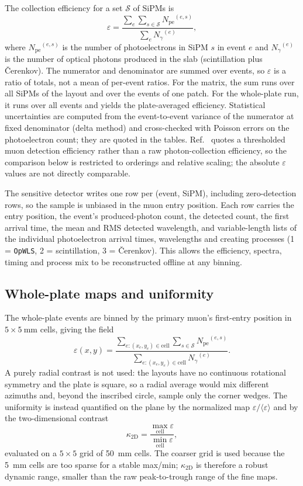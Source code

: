 \documentclass[preprint,12pt]{elsarticle}
\newcommand{\pe}{\ensuremath{N_{\mathrm{pe}}}}
\newcommand{\ngam}{\ensuremath{N_{\gamma}}}
\newcommand{\eps}{\ensuremath{\varepsilon}}
\newcommand{\ktwo}{\ensuremath{\kappa_{\mathrm{2D}}}}
\begin{document}
The collection efficiency for a set $\mathcal{S}$ of SiPMs is
\begin{equation}
\eps=\frac{\sum_e\sum_{s\in\mathcal{S}}\pe^{(e,s)}}{\sum_e\ngam^{(e)}},
\label{eq:eff}
\end{equation}
where $\pe^{(e,s)}$ is the number of photoelectrons in SiPM $s$ in event $e$ and
$\ngam^{(e)}$ is the number of optical photons produced in the slab (scintillation
plus \v{C}erenkov). The numerator and denominator are summed over events, so
$\eps$ is a ratio of totals, not a mean of per-event ratios. For the matrix, the
sum runs over all SiPMs of the layout and over the events of one patch. For the
whole-plate run, it runs over all events and yields the plate-averaged
efficiency. Statistical uncertainties are computed from the event-to-event
variance of the numerator at fixed denominator (delta method) and cross-checked
with Poisson errors on the photoelectron count; they are quoted in the tables.
Ref.~\cite{Rao2025} quotes a thresholded muon detection efficiency rather than a
raw photon-collection efficiency, so the comparison below is restricted to
orderings and relative scaling; the absolute \eps{} values are not directly
comparable.

The sensitive detector writes one row per (event, SiPM), including
zero-detection rows, so the sample is unbiased in the muon entry position. Each
row carries the entry position, the event's produced-photon count, the detected
count, the first arrival time, the mean and RMS detected wavelength, and
variable-length lists of the individual photoelectron arrival times,
wavelengths and creating processes (1 = \texttt{OpWLS}, 2 = scintillation,
3 = \v{C}erenkov). This allows the efficiency, spectra, timing and process mix
to be reconstructed offline at any binning.

\subsection{Whole-plate maps and uniformity}

The whole-plate events are binned by the primary muon's first-entry position in
$5\times\SI{5}{\milli\meter}$ cells, giving the field
\[
\eps(x,y)=
\frac{\sum_{e:(x_e,y_e)\in\mathrm{cell}}\sum_{s\in\mathcal{S}}\pe^{(e,s)}}
     {\sum_{e:(x_e,y_e)\in\mathrm{cell}}\ngam^{(e)}}.
\]
A purely radial contrast is not used: the layouts have no continuous rotational
symmetry and the plate is square, so a radial average would mix different
azimuths and, beyond the inscribed circle, sample only the corner wedges. The
uniformity is instead quantified on the plane by the normalized map
$\eps/\langle\eps\rangle$ and by the two-dimensional contrast
\begin{equation}
\ktwo=\frac{\max_{\mathrm{cell}}\eps}{\min_{\mathrm{cell}}\eps},
\end{equation}
evaluated on a $5\times5$ grid of \SI{50}{\milli\meter} cells. The coarser grid
is used because the \SI{5}{\milli\meter} cells are too sparse for a stable
max/min; $\ktwo$ is therefore a robust dynamic range, smaller than the raw
peak-to-trough range of the fine maps.
\end{document}
